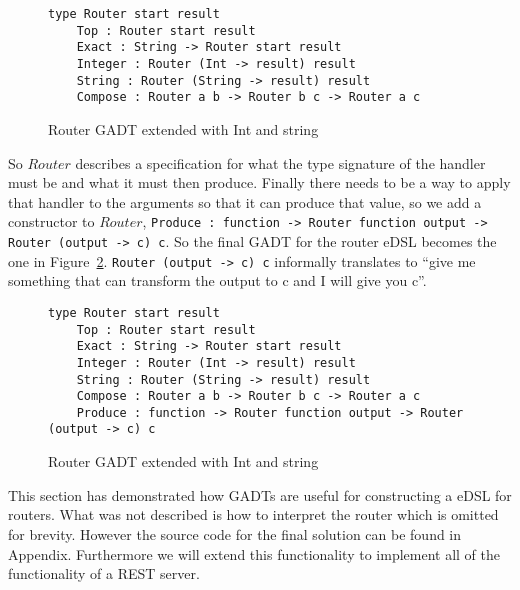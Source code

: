 \begin{figure}[H]
    \begin{lstlisting}
type Router start result 
    Top : Router start result
    Exact : String -> Router start result
    Integer : Router (Int -> result) result
    String : Router (String -> result) result
    Compose : Router a b -> Router b c -> Router a c
    \end{lstlisting}
    \caption{Router GADT extended with Int and string}
    \label{extendedrouter}
\end{figure}

So $Router$ describes a specification for what the type signature of the handler
must be and what it must then produce. Finally there needs to be a way to apply
that handler to the arguments so that it can produce that value, so we add a
constructor to $Router$, \texttt{Produce : function -> Router function output ->
Router (output -> c) c}. So the final GADT for the router eDSL becomes the one
in Figure~\ref{finalrouter}. \texttt{Router (output -> c) c} informally
translates to ``give me something that can transform the output to c and I will
give you c''.

\begin{figure}[H]
    \begin{lstlisting}
type Router start result 
    Top : Router start result
    Exact : String -> Router start result
    Integer : Router (Int -> result) result
    String : Router (String -> result) result
    Compose : Router a b -> Router b c -> Router a c
    Produce : function -> Router function output -> Router (output -> c) c
    \end{lstlisting}
    \caption{Router GADT extended with Int and string}
    \label{finalrouter}
\end{figure}

This section has demonstrated how GADTs are useful for constructing a eDSL for
routers. What was not described is how to interpret the router which is omitted
for brevity. However the source code for the final solution can be found in
Appendix. Furthermore we will extend this functionality to implement all of the
functionality of a REST server.



